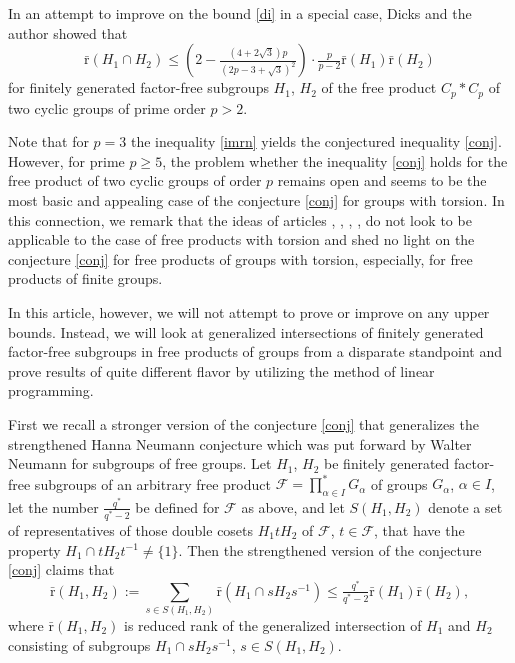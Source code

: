 \documentclass[10pt, reqno]{amsart}
\numberwithin{equation}{section}
\begin{document}
In an attempt to improve on the bound  \eqref{di} in a special  case, Dicks and the author  \cite{DIv2}  showed  that
   \begin{equation}\label{imrn}
  \bar {\mathrm{r}}(H_1\cap H_2)  \le   \left(2 - \tfrac{(4+2\sqrt{3})p}{(2p-3+\sqrt{3})^2} \right) \cdot \tfrac{p}{p-2}  \bar {\mathrm{r}}(H_1) \bar {\mathrm{r}}(H_2)
 \end{equation}
for finitely generated factor-free subgroups $H_1$, $H_2$ of the free product $C_p * C_p$ of two cyclic  groups of prime order $p >2$.

Note that for $p=3$ the inequality  \eqref{imrn}  yields the conjectured inequality  \eqref{conj}.  However,  for prime $p \ge 5$, the problem whether the inequality \eqref{conj} holds for  the free product of two cyclic groups of order $p$ remains open and seems to be the most basic and appealing case of the conjecture \eqref{conj}  for groups with torsion. In this connection, we remark that the ideas of articles \cite{ABC},  \cite{D2},  \cite{Fr},  \cite{Min}, do not look to be applicable to the case of free products with torsion and shed no light on the conjecture \eqref{conj} for free products of groups with torsion, especially, for free products of finite groups.
\medskip

In this article, however, we will not attempt to prove or improve on any upper bounds. Instead, we will look at generalized intersections of finitely generated factor-free subgroups in
free products of groups from a disparate standpoint and prove results of quite different flavor by utilizing the method of linear programming.

First we recall a stronger version of the conjecture \eqref{conj} that generalizes the  strengthened Hanna Neumann
conjecture which was  put forward by
Walter Neumann  \cite{N2}  for subgroups of free groups.  Let  $H_1$, $H_2$ be finitely generated factor-free subgroups of an arbitrary free product ${\mathcal{F}} = \prod_{\alpha \in I}^* G_\alpha$ of groups $G_\alpha$, $\alpha \in I$, let  the number $\tfrac{q^*}{q^*-2}$ be defined for ${\mathcal{F}}$ as above,   and let $S(H_1, H_2)$ denote a set of  representatives of those double cosets $H_1 t H_2$ of ${\mathcal{F}}$, $t \in {\mathcal{F}}$,   that have the property $H_1 \cap t H_2 t^{-1} \ne  \{ 1 \}$.  Then the  strengthened
version of  the conjecture \eqref{conj} claims that
\begin{equation}\label{conjs}
\bar {\mathrm{r}}(H_1, H_2) :=   \sum_{s \in S(H_1, H_2)} \bar {\mathrm{r}}(H_1\cap s H_2 s^{-1})
\le \tfrac{q^*}{q^*-2}   \bar {\mathrm{r}}(H_1) \bar {\mathrm{r}}(H_2)  ,
\end{equation}
where $\bar {\mathrm{r}}(H_1, H_2) $ is reduced rank of the generalized intersection of $H_1$ and $H_2$ consisting of subgroups $H_1\cap s H_2 s^{-1} $, $s \in S(H_1, H_2)$.
\end{document}
